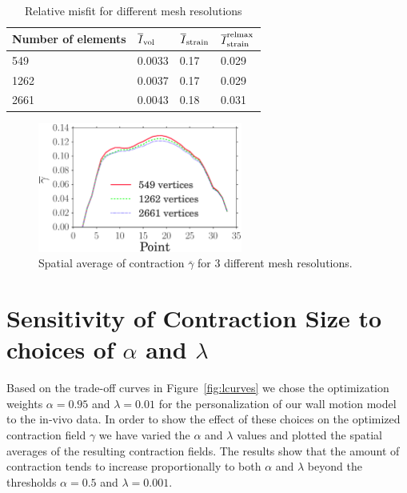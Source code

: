 \begin{table}
\caption{Relative misfit for different mesh resolutions}
\begin{tabular}{llll}
\toprule
Number of elements & $\overline{I}_{\text{vol}}$ & $\overline{I}_{\text{strain}}$ & $\overline{I}^{\text{relmax}}_{\text{strain}}$ \\ 
\midrule
549  & 0.0033 & 0.17 & 0.029 \\
1262 & 0.0037 & 0.17 & 0.029 \\
2661 & 0.0043 & 0.18 & 0.031 \\
\bottomrule	
\end{tabular}
\label{tab:mesh_conv_opt_misfit}
\end{table}

\begin{figure}[]
\includegraphics[width=0.6\textwidth]{mesh_conv_gamma}
\caption{Spatial average of contraction $\overline{\gamma}$ for 3 different mesh
  resolutions.}
\label{fig:mesh_conv_gamma}
\end{figure}


\section{Sensitivity of Contraction Size to choices of $\alpha$ and $\lambda$}
\label{sec:sense_alpha_lambda}
Based on the trade-off curves in Figure~\ref{fig:lcurves} we chose 
the optimization weights $\alpha = 0.95$ and $\lambda = 0.01$ for the personalization
of our wall motion model to the in-vivo data. In order to show the effect of these 
choices on the optimized contraction field $\gamma$ we have varied
the $\alpha$ and $\lambda$ values and plotted the spatial averages of the resulting
contraction fields. The results show that the amount of contraction tends to increase
proportionally to both $\alpha$ and $\lambda$ beyond the thresholds $\alpha = 0.5$ and
$\lambda = 0.001$. 

